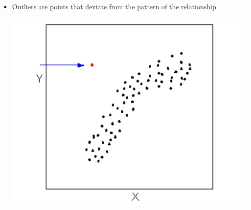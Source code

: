 \begin{itemize}
\begin{center}
  \end{center}
\item
  Outliers are points that deviate from the pattern of the relationship.
\begin{center}
  \includegraphics[scale=0.4]{Figures/outlier-in-relationship}
\end{center}
\end{itemize}

